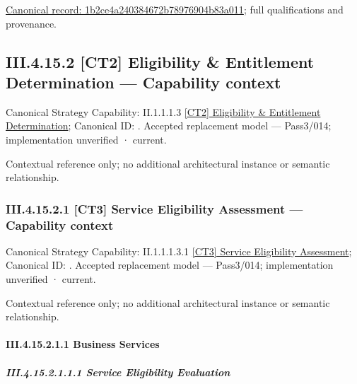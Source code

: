 {\footnotesize \href{../../../../continuum/business/business-function/1b2ce4a240384672b78976904b83a011.md}{Canonical record: 1b2ce4a240384672b78976904b83a011}; full qualifications and provenance.}\par
\subsection*{III.4.15.2 [CT2] Eligibility \& Entitlement Determination — Capability context}
\label{navigation:III.4.15.2}

{\small Canonical Strategy Capability: II.1.1.1.3 \hyperref[element:2239340b964c49bab172d8c5cf4ba4cd]{[CT2] Eligibility \& Entitlement Determination}; Canonical ID: \texttt{}. Accepted replacement model — Pass3/014; implementation unverified · current.}\par
Contextual reference only; no additional architectural instance or semantic relationship.\par
\subsubsection*{III.4.15.2.1 [CT3] Service Eligibility Assessment — Capability context}
\label{navigation:III.4.15.2.1}

{\small Canonical Strategy Capability: II.1.1.1.3.1 \hyperref[element:94d9c75393684e638e5c3b1c83ed99be]{[CT3] Service Eligibility Assessment}; Canonical ID: \texttt{}. Accepted replacement model — Pass3/014; implementation unverified · current.}\par
Contextual reference only; no additional architectural instance or semantic relationship.\par
\paragraph*{III.4.15.2.1.1 Business Services}
\label{navigation:III.4.15.2.1.1}

\subparagraph*{III.4.15.2.1.1.1 Service Eligibility Evaluation}
\label{navigation:III.4.15.2.1.1.1}

